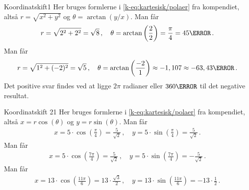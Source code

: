\begin{opgave}{Koordinatskift}{1}
Her bruges formlerne i \eqref{k-eq:kartesisk/polaer} fra kompendiet, altså $r = \sqrt{x^2 + y^2}$ og $\theta = \arctan\left(y/x\right)$.
\opg Man får
\begin{align*}
r = \sqrt{2^2+2^2} = \sqrt{8} \, , \quad \theta = \arctan \left( \frac{2}{2} \right) = \frac{\pi}{4} = 45 \degree \, .
\end{align*} 
\opg Man får
\begin{align*}
r = \sqrt{1^2 + (-2)^2} = \sqrt{5} \, , \quad \theta = \arctan \left( \frac{-2}{1} \right) \approx -1,107 \approx -63,43\degree \, .
\end{align*}
Det positive svar findes ved at ligge $2\pi$ radianer eller $360\degree$ til det negative resultat.
\end{opgave}
\begin{opgave}{Koordinatskift 2}{1}
Her bruges formlerne i \eqref{k-eq:kartesisk/polaer} fra kompendiet, altså $x = r \cos(\theta)$ og $y = r \sin(\theta)$.
\opg Man får
\begin{align*}
x = 5 \cdot \cos\left( \frac{\pi}{4} \right) = \frac{5}{\sqrt{2}} \, , \quad y = 5 \cdot \sin\left(\frac{\pi}{4}\right) = \frac{5}{\sqrt{2}} \, .
\end{align*}
\opg Man får
\begin{align*}
x = 5 \cdot \cos\left(\frac{7\pi}{4}\right) =  \frac{5}{\sqrt{2}} \, , \quad y = 5 \cdot \sin\left(\frac{7\pi}{4}\right) = - \frac{5}{\sqrt{2}} \, .
\end{align*}
\opg Man får
\begin{align*}
x = 13 \cdot \cos\left(\frac{11\pi}{6}\right) = 13 \cdot \frac{\sqrt{3}}{2} \, , \quad y = 13 \cdot \sin\left(\frac{11\pi}{6}\right) =  -13 \cdot \frac{1}{2} \, .
\end{align*}
\end{opgave}
